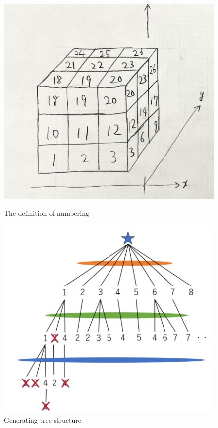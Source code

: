 \documentclass[a4paper,twoside,12pt,papersize, dvipdfmx]{iirthesis}
\begin{document}
\begin{figure}[t]
\centering
\begin{minipage}{0.49\hsize}
\includegraphics[width=0.9\hsize]{fig/3-new-planner/numbering.jpg}
\caption{The definition of numbering}\label{fig::planner::numbering}
\end{minipage}\hfill
\begin{minipage}{0.49\hsize}
\includegraphics[width=0.9\hsize]{fig/3-new-planner/treegraph.jpg}
\caption{Generating tree structure}\label{fig::planner::treegraph}
\end{minipage}
\end{figure}
\end{document}
